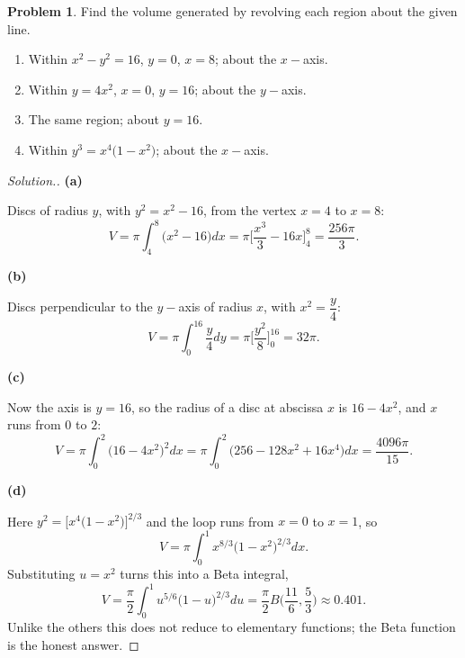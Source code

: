 \documentclass[11pt,a4paper]{article}
\theoremstyle{definition}
\newtheorem{problemx}{Problem}[subsection]
\newenvironment{problem}{\begin{problemx}}{\end{problemx}}
\newenvironment{solution}
  {\renewcommand{\qedsymbol}{}\begin{proof}[\textit{Solution}.]}
  {\end{proof}}
\newcommand{\subhead}[1]{%
  \par\medskip\noindent\textbf{#1}\par\nobreak\smallskip}
\begin{document}
\begin{problem}
Find the volume generated by revolving each region about the given line.
\begin{enumerate}
\item[(a)] Within $x^2-y^2 = 16$, $y = 0$, $x = 8$; about the $x-$axis.
\item[(b)] Within $y = 4x^2$, $x = 0$, $y = 16$; about the $y-$axis.
\item[(c)] The same region; about $y = 16$.
\item[(d)] Within $y^3 = x^4\big(1-x^2\big)$; about the $x-$axis.
\end{enumerate}
\end{problem}
\begin{solution}
\subhead{(a)} Discs of radius $y$, with $y^2 = x^2-16$, from the vertex $x=4$ to
$x=8$:
$$V = \pi\int_4^8\big(x^2-16\big)dx
= \pi\Big[\frac{x^3}{3}-16x\Big]_4^8 = \frac{256\pi}{3}.$$

\subhead{(b)} Discs perpendicular to the $y-$axis of radius $x$, with
$x^2 = \dfrac y4$:
$$V = \pi\int_0^{16}\frac{y}{4}dy = \pi\Big[\frac{y^2}{8}\Big]_0^{16} = 32\pi .$$

\subhead{(c)} Now the axis is $y = 16$, so the radius of a disc at abscissa $x$
is $16 - 4x^2$, and $x$ runs from $0$ to $2$:
$$V = \pi\int_0^2\big(16-4x^2\big)^2dx
= \pi\int_0^2\big(256 - 128x^2 + 16x^4\big)dx = \frac{4096\pi}{15}.$$

\subhead{(d)} Here $y^2 = \Big[x^4\big(1-x^2\big)\Big]^{2/3}$ and the loop runs
from $x=0$ to $x=1$, so
$$V = \pi\int_0^1x^{8/3}\big(1-x^2\big)^{2/3}dx .$$
Substituting $u = x^2$ turns this into a Beta integral,
$$V = \frac{\pi}{2}\int_0^1u^{5/6}\big(1-u\big)^{2/3}du
= \frac{\pi}{2}B\Big(\frac{11}{6},\frac53\Big)\approx 0.401 .$$
Unlike the others this does not reduce to elementary functions; the Beta
function is the honest answer.
\end{solution}
\end{document}
